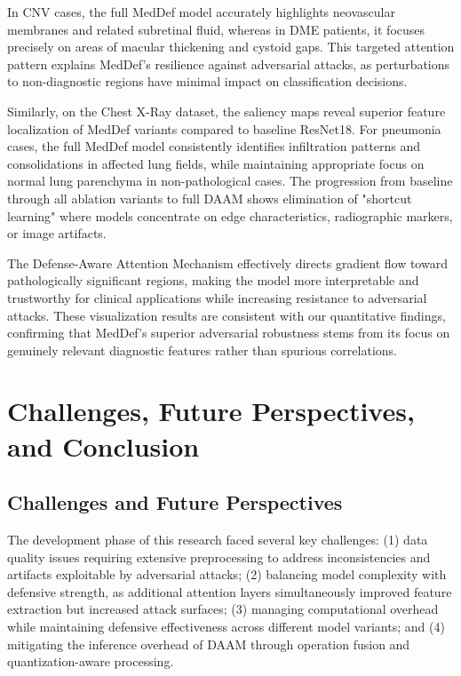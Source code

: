 \documentclass[preprint,12pt]{elsarticle}
\begin{document}
In CNV cases, the full MedDef model accurately highlights neovascular membranes and related subretinal fluid, whereas in DME patients, it focuses precisely on areas of macular thickening and cystoid gaps. This targeted attention pattern explains MedDef's resilience against adversarial attacks, as perturbations to non-diagnostic regions have minimal impact on classification decisions.

Similarly, on the Chest X-Ray dataset, the saliency maps reveal superior feature localization of MedDef variants compared to baseline ResNet18. For pneumonia cases, the full MedDef model consistently identifies infiltration patterns and consolidations in affected lung fields, while maintaining appropriate focus on normal lung parenchyma in non-pathological cases. The progression from baseline through all ablation variants to full DAAM shows elimination of "shortcut learning" where models concentrate on edge characteristics, radiographic markers, or image artifacts.

The Defense-Aware Attention Mechanism effectively directs gradient flow toward pathologically significant regions, making the model more interpretable and trustworthy for clinical applications while increasing resistance to adversarial attacks. These visualization results are consistent with our quantitative findings, confirming that MedDef's superior adversarial robustness stems from its focus on genuinely relevant diagnostic features rather than spurious correlations.

\section{Challenges, Future Perspectives, and Conclusion}
\label{sec:challenges}

\subsection{Challenges and Future Perspectives}
The development phase of this research faced several key challenges: (1) data quality issues requiring extensive preprocessing to address inconsistencies and artifacts exploitable by adversarial attacks; (2) balancing model complexity with defensive strength, as additional attention layers simultaneously improved feature extraction but increased attack surfaces; (3) managing computational overhead while maintaining defensive effectiveness across different model variants; and (4) mitigating the inference overhead of DAAM through operation fusion and quantization-aware processing.
\end{document}
